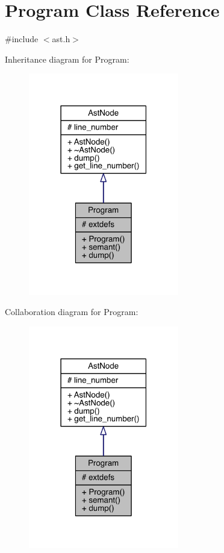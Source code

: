 \hypertarget{class_program}{}\section{Program Class Reference}
\label{class_program}


{\ttfamily \#include $<$ast.\+h$>$}



Inheritance diagram for Program\+:\nopagebreak
\begin{figure}[H]
\begin{center}
\leavevmode
\includegraphics[width=186pt]{class_program__inherit__graph}
\end{center}
\end{figure}


Collaboration diagram for Program\+:\nopagebreak
\begin{figure}[H]
\begin{center}
\leavevmode
\includegraphics[width=186pt]{class_program__coll__graph}
\end{center}
\end{figure}
